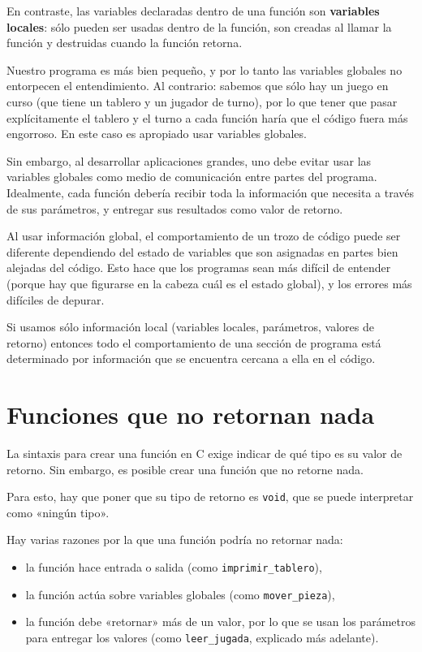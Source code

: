 En contraste, las variables declaradas dentro de una función son
\textbf{variables locales}: sólo pueden ser usadas dentro de la función,
son creadas al llamar la función y destruidas cuando la función retorna.

Nuestro programa es más bien pequeño, y por lo tanto las variables
globales no entorpecen el entendimiento. Al contrario: sabemos que sólo
hay un juego en curso (que tiene un tablero y un jugador de turno), por
lo que tener que pasar explícitamente el tablero y el turno a cada
función haría que el código fuera más engorroso. En este caso es
apropiado usar variables globales.

Sin embargo, al desarrollar aplicaciones grandes, uno debe evitar usar
las variables globales como medio de comunicación entre partes del
programa. Idealmente, cada función debería recibir toda la información
que necesita a través de sus parámetros, y entregar sus resultados como
valor de retorno.

Al usar información global, el comportamiento de un trozo de código
puede ser diferente dependiendo del estado de variables que son
asignadas en partes bien alejadas del código. Esto hace que los
programas sean más difícil de entender (porque hay que figurarse en la
cabeza cuál es el estado global), y los errores más difíciles de
depurar.

Si usamos sólo información local (variables locales, parámetros, valores
de retorno) entonces todo el comportamiento de una sección de programa
está determinado por información que se encuentra cercana a ella en el
código.

\section{Funciones que no retornan nada}

La sintaxis para crear una función en C exige indicar de qué tipo es su
valor de retorno. Sin embargo, es posible crear una función que no
retorne nada.

Para esto, hay que poner que su tipo de retorno es \lstinline!void!, que
se puede interpretar como «ningún tipo».

Hay varias razones por la que una función podría no retornar nada:

\begin{itemize}
\item
  la función hace entrada o salida (como \lstinline!imprimir_tablero!),
\item
  la función actúa sobre variables globales (como
  \lstinline!mover_pieza!),
\item
  la función debe «retornar» más de un valor, por lo que se usan los
  parámetros para entregar los valores (como \lstinline!leer_jugada!,
  explicado más adelante).
\end{itemize}


